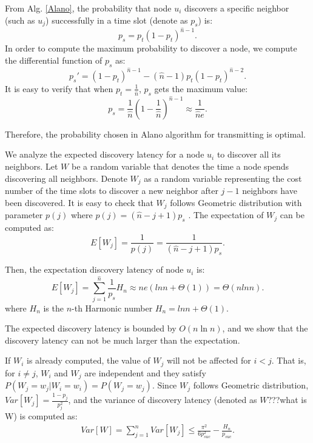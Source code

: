 From Alg. \ref{Alano}, the probability that node $u_i$ discovers a specific neighbor (such as $u_j$) successfully in a time slot (denote as $p_s$) is:
$$
p_s = p_t{(1-p_t)}^{\hat{n}-1}.
$$
In order to compute the maximum probability to discover a node, we compute the differential function of $p_s$ as:
$$
p_s' = {(1-p_t)}^{\hat{n}-1}-(\hat{n}-1)p_t{(1-p_t)}^{\hat{n}-2}.
$$
It is easy to verify that when $p_t=\frac{1}{\hat{n}}$, $p_s$ gets the maximum value:
$$p_s = \frac{1}{\hat{n}}{(1-\frac{1}{\hat{n}})}^{\hat{n}-1} \approx \frac{1}{\hat{n}e}.$$

Therefore, the probability chosen in Alano algorithm for transmitting is optimal.

We analyze the expected discovery latency for a node $u_i$ to discover all its neighbors. Let $W$ be a random variable that denotes
the time a node spends discovering all neighbors. Denote $W_j$ as a random variable representing the cost number of the time slots to discover a new neighbor after $j-1$ neighbors have been discovered. It is easy to check that $W_j$ follows Geometric distribution with parameter $p(j)$ where $p(j)=(\hat{n}-j+1)p_s$ \cite{Motwani1995Randomized}. The expectation
of $W_j$ can be computed as:
$$
E[W_j]=\frac{1}{p(j)}=\frac{1}{(\hat{n}-j+1)p_s}.
$$

Then, the expectation discovery latency of node $u_i$ is:
$$
E[W_j] = \sum_{j=1}^{\hat{n}}\frac{1}{p_s}H_n \approx ne(lnn + \Theta(1)) = \Theta(nlnn).
$$
where $H_n$ is the $n$-th Harmonic number $H_n = lnn + \Theta(1)$.


The expected discovery latency is bounded by $O(n\ln n)$, and we show that the discovery latency can not be much larger than the expectation.

If $W_i$ is already computed, the value of $W_j$ will not be affected for $i<j$. That is, for $i\ne j$, $W_i$ and $W_j$ are independent and they satisfy $P(W_j=w_j|W_i=w_i)=P(W_j=w_j)$. Since $W_j$ follows Geometric distribution, $Var[W_j]=\frac{1-p_j}{p_j^2}$, and the variance of discovery latency (denoted as $W$???what is W) is computed as:
\begin{displaymath}
\begin{split}
 Var[W] %
 =\sum_{j=1}^{n}Var[W_j]
 \le\frac{\pi^2}{6p_{suc}^2}-\frac{H_n}{p_{suc}}.
\end{split}
\end{displaymath}

